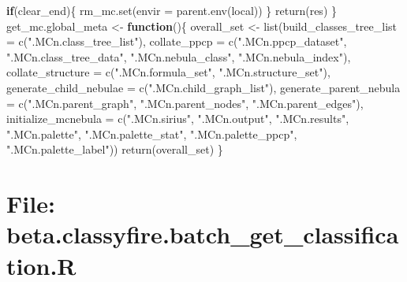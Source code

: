 \documentclass[
]{article}
\newenvironment{Shaded}{\begin{snugshade}}{\end{snugshade}}
\newcommand{\AttributeTok}[1]{\textcolor[rgb]{0.77,0.63,0.00}{#1}}
\newcommand{\ControlFlowTok}[1]{\textcolor[rgb]{0.13,0.29,0.53}{\textbf{#1}}}
\newcommand{\FunctionTok}[1]{\textcolor[rgb]{0.00,0.00,0.00}{#1}}
\newcommand{\NormalTok}[1]{#1}
\newcommand{\OtherTok}[1]{\textcolor[rgb]{0.56,0.35,0.01}{#1}}
\newcommand{\StringTok}[1]{\textcolor[rgb]{0.31,0.60,0.02}{#1}}
\begin{document}
\begin{Shaded}
\begin{Highlighting}[]
    \ControlFlowTok{if}\NormalTok{(clear\_end)\{}
      \FunctionTok{rm\_mc.set}\NormalTok{(}\AttributeTok{envir =} \FunctionTok{parent.env}\NormalTok{(local))}
\NormalTok{    \}}
    \FunctionTok{return}\NormalTok{(res)}
\NormalTok{  \}}
\NormalTok{get\_mc.global\_meta }\OtherTok{\textless{}{-}} 
  \ControlFlowTok{function}\NormalTok{()\{}
\NormalTok{    overall\_set }\OtherTok{\textless{}{-}} \FunctionTok{list}\NormalTok{(}\AttributeTok{build\_classes\_tree\_list =} \FunctionTok{c}\NormalTok{(}\StringTok{".MCn.class\_tree\_list"}\NormalTok{),}
                        \AttributeTok{collate\_ppcp =} \FunctionTok{c}\NormalTok{(}\StringTok{".MCn.ppcp\_dataset"}\NormalTok{,}
                                         \StringTok{".MCn.class\_tree\_data"}\NormalTok{,}
                                         \StringTok{".MCn.nebula\_class"}\NormalTok{,}
                                         \StringTok{".MCn.nebula\_index"}\NormalTok{),}
                        \AttributeTok{collate\_structure =} \FunctionTok{c}\NormalTok{(}\StringTok{".MCn.formula\_set"}\NormalTok{,}
                                              \StringTok{".MCn.structure\_set"}\NormalTok{),}
                        \AttributeTok{generate\_child\_nebulae =} \FunctionTok{c}\NormalTok{(}\StringTok{".MCn.child\_graph\_list"}\NormalTok{),}
                        \AttributeTok{generate\_parent\_nebula =} \FunctionTok{c}\NormalTok{(}\StringTok{".MCn.parent\_graph"}\NormalTok{,}
                                                   \StringTok{".MCn.parent\_nodes"}\NormalTok{,}
                                                   \StringTok{".MCn.parent\_edges"}\NormalTok{),}
                        \AttributeTok{initialize\_mcnebula =} \FunctionTok{c}\NormalTok{(}\StringTok{".MCn.sirius"}\NormalTok{,}
                                                \StringTok{".MCn.output"}\NormalTok{,}
                                                \StringTok{".MCn.results"}\NormalTok{,}
                                                \StringTok{".MCn.palette"}\NormalTok{,}
                                                \StringTok{".MCn.palette\_stat"}\NormalTok{,}
                                                \StringTok{".MCn.palette\_ppcp"}\NormalTok{,}
                                                \StringTok{".MCn.palette\_label"}\NormalTok{))}
    \FunctionTok{return}\NormalTok{(overall\_set)}
\NormalTok{  \}}
\end{Highlighting}
\end{Shaded}

\hypertarget{file-beta.classyfire.batch_get_classification.r}{%
\section{File: beta.classyfire.batch\_get\_classification.R}\label{file-beta.classyfire.batch_get_classification.r}}
\end{document}
